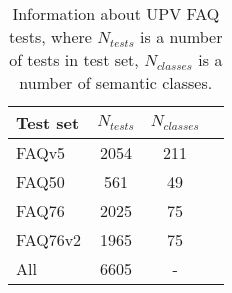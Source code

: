 \begin{table}[!ht] 
  \centering   
  \begin{tabular}{lccc}
    \toprule
    Test set & $N_{tests}$  & $N_{classes}$\\
    \midrule
    FAQv5     & 2054 & 211 \\
    FAQ50     & 561  & 49  \\
    FAQ76     & 2025 & 75  \\
    FAQ76v2   & 1965 & 75  \\
    \midrule
    All       & 6605 & -   \\
    \bottomrule
  \end{tabular}
  \caption{Information about UPV FAQ tests, where $N_{tests}$ is a number of tests in test set, $N_{classes}$ is a number of semantic classes.}
  \label{table:UPV_FAQ_info}
\end{table}